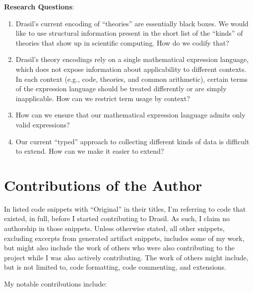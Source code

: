 \noindent\textbf{Research Questions}:

\begin{enumerate}

      \item[\namedlabel{rq:modelkinds}{RQ1}] Drasil's current encoding of
            ``theories'' are essentially black boxes. We would like to use
            structural information present in the short list of the ``kinds'' of
            theories that show up in scientific computing. How do we codify
            that?

      \item[\namedlabel{rq:lang_division}{RQ2}] Drasil's theory encodings rely
            on a single mathematical expression language, which does not expose
            information about applicability to different contexts. In each
            context (e.g., code, theories, and common arithmetic), certain terms
            of the expression language should be treated differently or are
            simply inapplicable. How can we restrict term usage by context?

      \item[\namedlabel{rq:typing}{RQ3}] How can we ensure that our mathematical
            expression language admits only valid expressions?

      \item[\namedlabel{rq:chunkdb}{RQ4}] Our current ``typed'' approach to
            collecting different kinds of data is difficult to extend. How can
            we make it easier to extend?

\end{enumerate}

\section{Contributions of the Author}
\label{chap:intro:sec:contributions}

In listed code snippets with ``Original'' in their titles, I'm referring to code
that existed, in full, before I started contributing to Drasil. As such, I claim
no authorship in those snippets. Unless otherwise stated, all other snippets,
excluding excerpts from generated artifact snippets, includes some of my work,
but might also include the work of others who were also contributing to the
project while I was also actively contributing. The work of others might
include, but is not limited to, code formatting, code commenting, and
extensions.

My notable contributions include:

